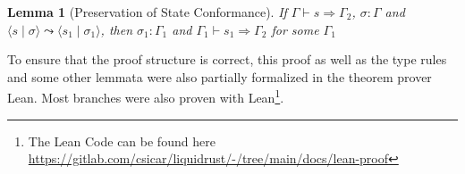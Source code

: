 \documentclass[twoside, english, final]{sdqthesis}
\newcommand{\tuple}[2]{\langle #1 \mid #2 \rangle}
\newtheorem{lemma}[theorem]{Lemma}
\theoremstyle{definition}
\begin{document}



\begin{lemma}[Preservation of State Conformance]\label{lem:preservation-conformance}
  If $\Gamma \vdash s \Rightarrow \Gamma_2$, $\sigma : \Gamma$ and $\tuple{s}{\sigma} \leadsto \tuple{s_1}{\sigma_1}$, then  $\sigma_1 : \Gamma_1$ and $\Gamma_1 \vdash s_1 \Rightarrow \Gamma_2$ for some $\Gamma_1$
\end{lemma}
To ensure that the proof structure is correct, this proof as well as the type rules and some other lemmata were also partially formalized in the theorem prover Lean\cite{de_moura_lean_2015}. Most branches were also proven with Lean\footnote{The Lean Code can be found here \url{https://gitlab.com/csicar/liquidrust/-/tree/main/docs/lean-proof}}.
\end{document}
